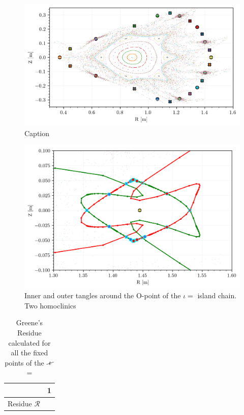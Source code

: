 \begin{figure}[H]
    \centering
    \includegraphics{images/quasrs/fixedpoint_ox_0928241.png}
    \caption{Caption}
    \label{fig:enter-label}
\end{figure}


\begin{figure}[H]
    \centering
    \includegraphics{images/quasrs/outer_0928241.png}
    \caption{Inner and outer tangles around the O-point of the $\iota = $ island chain. Two homoclinics }
    \label{fig:enter-label}
\end{figure}

\begin{table}[H]
    \centering
    \begin{tabular}{c|c}
         & 1 \\
         \hline Residue $\mathcal{R}$ & 
    \end{tabular}
    \caption{Greene's Residue calculated for all the fixed points of the $\iotaslash$ = }
    \label{tab:greenes}
\end{table}

